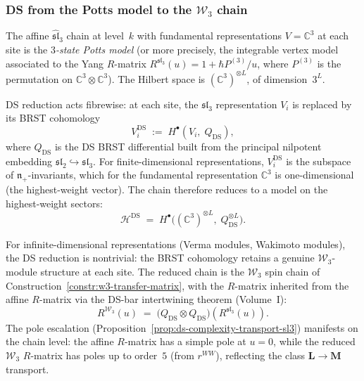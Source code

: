 \subsubsection{DS from the Potts model to the $\mathcal{W}_3$
chain}

\begin{construction}
\label{constr:ds-potts-to-w3}
%
%
The affine $\widehat{\mathfrak{sl}}_3$ chain at level~$k$
with fundamental representations $V = \mathbb{C}^3$ at each
site is the \emph{$3$-state Potts model} (or more precisely,
the integrable vertex model associated to the Yang $R$-matrix
$R^{\mathfrak{sl}_3}(u) = 1 + \hbar P^{(3)}/u$, where
$P^{(3)}$ is the permutation on $\mathbb{C}^3 \otimes
\mathbb{C}^3$). The Hilbert space is $(\mathbb{C}^3)^{\otimes
L}$, of dimension~$3^L$.

DS reduction acts fibrewise: at each site, the
$\mathfrak{sl}_3$ representation $V_i$ is replaced by its
BRST cohomology
\begin{equation}
\label{eq:ds-site-reduction}
V_i^{\mathrm{DS}}
\;:=\;
H^\bullet(V_i,\; Q_{\mathrm{DS}}),
\end{equation}
where $Q_{\mathrm{DS}}$ is the DS BRST differential built from
the principal nilpotent embedding
$\mathfrak{sl}_2 \hookrightarrow \mathfrak{sl}_3$. For
finite-dimensional representations, $V_i^{\mathrm{DS}}$ is
the subspace of $\mathfrak{n}_+$-invariants, which for the
fundamental representation $\mathbb{C}^3$ is one-dimensional
(the highest-weight vector). The chain therefore reduces to
a model on the highest-weight sectors:
\begin{equation}
\label{eq:ds-chain-reduction}
\mathcal{H}^{\mathrm{DS}}
\;=\;
H^\bullet\!\bigl((\mathbb{C}^3)^{\otimes L},\;
 Q_{\mathrm{DS}}^{\otimes L}\bigr).
\end{equation}

For infinite-dimensional representations (Verma modules,
Wakimoto modules), the DS reduction is nontrivial: the
BRST cohomology retains a genuine $\mathcal{W}_3$-module
structure at each site. The reduced chain is the
$\mathcal{W}_3$ spin chain of
Construction~\ref{constr:w3-transfer-matrix}, with the
$R$-matrix inherited from the affine $R$-matrix via
the DS-bar intertwining theorem (Volume~I):
\begin{equation}
\label{eq:ds-r-matrix-transport}
R^{\mathcal{W}_3}(u)
\;=\;
\bigl(Q_{\mathrm{DS}} \otimes Q_{\mathrm{DS}}\bigr)\!
\left(R^{\mathfrak{sl}_3}(u)\right).
\end{equation}
The pole escalation
(Proposition~\ref{prop:ds-complexity-transport-sl3}) manifests
on the chain level: the affine $R$-matrix has a simple pole
at $u = 0$, while the reduced $\mathcal{W}_3$ $R$-matrix
has poles up to order~$5$ (from $r^{WW}$), reflecting the
class $\mathbf{L} \to \mathbf{M}$ transport.
\end{construction}

